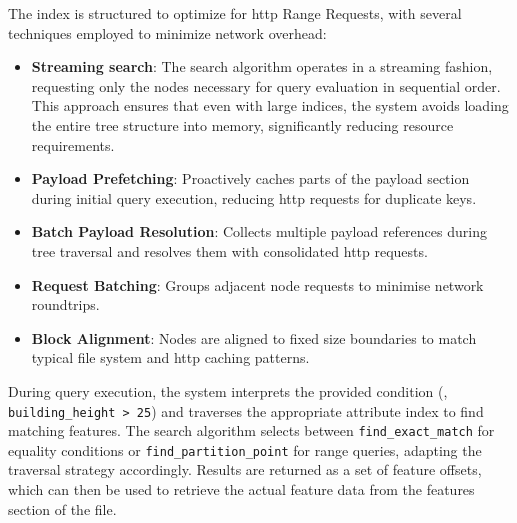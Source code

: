 The index is structured to optimize for \ac{http} Range Requests, with several techniques employed to minimize network overhead:

\begin{itemize}
  \item \textbf{Streaming search}: The search algorithm operates in a streaming fashion, requesting only the nodes necessary for query evaluation in sequential order. This approach ensures that even with large indices, the system avoids loading the entire tree structure into memory, significantly reducing resource requirements.
  \item \textbf{Payload Prefetching}: Proactively caches parts of the payload section during initial query execution, reducing \ac{http} requests for duplicate keys.
  \item \textbf{Batch Payload Resolution}: Collects multiple payload references during tree traversal and resolves them with consolidated \ac{http} requests.
  \item \textbf{Request Batching}: Groups adjacent node requests to minimise network roundtrips.
  \item \textbf{Block Alignment}: Nodes are aligned to fixed size boundaries to match typical file system and \ac{http} caching patterns.
\end{itemize}

During query execution, the system interprets the provided condition (\eg, \texttt{building\_height > 25}) and traverses the appropriate attribute index to find matching features. The search algorithm selects between \texttt{find\_exact\_match} for equality conditions or \texttt{find\_partition\_point} for range queries, adapting the traversal strategy accordingly. Results are returned as a set of feature offsets, which can then be used to retrieve the actual feature data from the features section of the file.
